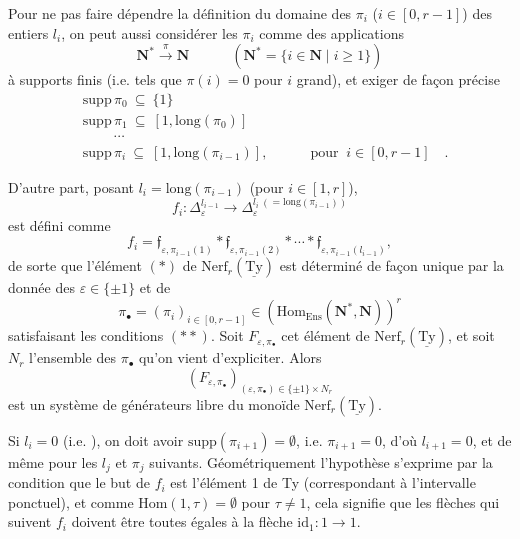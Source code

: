 \documentclass[11pt]{article}
\newcommand{\printedpage}[1]{\marginpar{\footnotesize p.~#1}}
\newcommand{\msp}[1]{\marginpar{\vspace*{10pt}\footnotesize [#1]}}
\newcommand{\Ty}{\underline{\mathrm{Ty}}}
\newcommand{\Nerf}{\mathrm{Nerf}}
\begin{document}
\msp{page 57}
Pour ne pas faire dépendre la définition du domaine des $\pi_i$ ($i\in[0,r-1]$) des entiers $l_i$, on peut aussi considérer les $\pi_i$ comme des applications
\[
\mathbf{N}^*\xrightarrow{\ \pi\ }\mathbf{N} \qquad\quad (\mathbf{N}^*=\{i\in\mathbf{N}\mid i\geq 1\})
\]
à supports finis (i.e. tels que $\pi(i)=0$ pour $i$ grand), et exiger de façon précise
\[
\begin{aligned}
&\mathrm{supp}\,\pi_0\ \subseteq\ \{1\}\\
&\mathrm{supp}\,\pi_1\ \subseteq\ [1,\mathrm{long}(\pi_0)]\\
&\qquad\ \cdots\\
&\boxed{\mathrm{supp}\,\pi_i\ \subseteq\ [1,\mathrm{long}(\pi_{i-1})]}, \qquad\quad \text{pour }\ \boxed{i\in[0,r-1]}\quad .
\end{aligned}
\tag*{$(**)$}
\]

\printedpage{39}
D'autre part, posant $l_i = \mathrm{long}(\pi_{i-1})$ (pour $i \in [1,r]$),
\[
f_i : \Delta_\varepsilon^{l_{i-1}} \longrightarrow \Delta_\varepsilon^{l_i\ (=\mathrm{long}(\pi_{i-1}))}
\]
est défini comme
\[
f_i = \mathfrak{f}_{\varepsilon,\pi_{i-1}(1)} * \mathfrak{f}_{\varepsilon,\pi_{i-1}(2)} * \cdots * \mathfrak{f}_{\varepsilon,\pi_{i-1}(l_{i-1})},
\]
de sorte que l'élément $(*)$ de $\Nerf_r(\Ty)$ est déterminé de façon unique par la donnée des $\varepsilon \in \{\pm 1\}$ et de
\[
\pi_\bullet = (\pi_i)_{i\in[0,r-1]} \in (\mathrm{Hom}_{\mathrm{Ens}}(\mathbf{N}^*,\mathbf{N}))^r
\]
satisfaisant les conditions $(**)$. Soit $F_{\varepsilon,\pi_\bullet}$ cet élément de $\Nerf_r(\Ty)$, et soit $N_r$ l'ensemble des $\pi_\bullet$ qu'on vient d'expliciter. Alors
\[
(F_{\varepsilon,\pi_\bullet})_{(\varepsilon,\pi_\bullet)\in\{\pm1\}\times N_r}
\]
est un système de générateurs libre du monoïde $\Nerf_r(\Ty)$.

Si $l_i = 0$ (i.e. ), on doit avoir $\mathrm{supp}(\pi_{i+1}) = \emptyset$, i.e. $\pi_{i+1} = 0$, d'où $l_{i+1} = 0$, et de même pour les $l_j$ et $\pi_j$ suivants. Géométriquement l'hypothèse s'exprime par la condition que le but
\msp{page 58}
de $f_i$ est l'élément 1 de Ty (correspondant à l'intervalle ponctuel), et comme $\mathrm{Hom}(1,\tau) = \emptyset$ pour $\tau \neq 1$, cela signifie que les flèches qui suivent $f_i$ doivent être toutes égales à la flèche $\mathrm{id}_1 : 1 \longrightarrow 1$.
\end{document}

